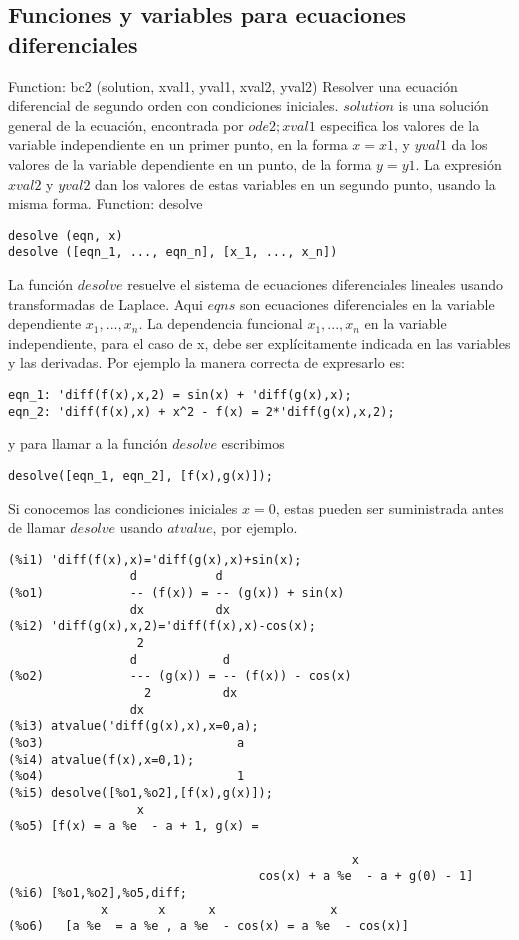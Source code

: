 \documentclass{article}
\begin{document}
\subsection{Funciones y variables para ecuaciones diferenciales}
Function: bc2 (solution, xval1, yval1, xval2, yval2)
\newline
Resolver una ecuación diferencial de segundo orden con condiciones iniciales.
$solution$ is una solución general de la ecuación, encontrada por $ode2;xval1$ especifica los valores de la variable independiente en un primer punto, en la forma $x=x1$, y $yval1$ da los valores de la variable dependiente en un punto, de la forma $y= y1$. La expresión $xval2$ y $yval2$ dan los valores de estas variables en un segundo punto, usando la misma forma.
\newline
Function: desolve
\newline
\begin{verbatim}
desolve (eqn, x)
desolve ([eqn_1, ..., eqn_n], [x_1, ..., x_n])
\end{verbatim}
La función $desolve$ resuelve el sistema de ecuaciones diferenciales lineales usando transformadas de Laplace. Aqui $eqns$ son ecuaciones diferenciales en la variable dependiente $x_1, ..., x_n$.
\newline
La dependencia funcional $x_1, ..., x_n$ en la variable independiente, para el caso de x, debe ser explícitamente indicada en las variables y las derivadas. Por ejemplo la manera correcta de expresarlo es:
\begin{verbatim}
eqn_1: 'diff(f(x),x,2) = sin(x) + 'diff(g(x),x);
eqn_2: 'diff(f(x),x) + x^2 - f(x) = 2*'diff(g(x),x,2);
\end{verbatim}
y para llamar a la función $desolve$ escribimos
\begin{verbatim}
desolve([eqn_1, eqn_2], [f(x),g(x)]);
\end{verbatim}
Si conocemos las condiciones iniciales $x=0$, estas pueden ser suministrada antes de llamar $desolve$ usando $atvalue$, por ejemplo.
\begin{verbatim}
(%i1) 'diff(f(x),x)='diff(g(x),x)+sin(x);
                 d           d
(%o1)            -- (f(x)) = -- (g(x)) + sin(x)
                 dx          dx
(%i2) 'diff(g(x),x,2)='diff(f(x),x)-cos(x);
                  2
                 d            d
(%o2)            --- (g(x)) = -- (f(x)) - cos(x)
                   2          dx
                 dx
(%i3) atvalue('diff(g(x),x),x=0,a);
(%o3)                           a
(%i4) atvalue(f(x),x=0,1);
(%o4)                           1
(%i5) desolve([%o1,%o2],[f(x),g(x)]);
                  x
(%o5) [f(x) = a %e  - a + 1, g(x) =

                                                x
                                   cos(x) + a %e  - a + g(0) - 1]
(%i6) [%o1,%o2],%o5,diff;
             x       x      x                x
(%o6)   [a %e  = a %e , a %e  - cos(x) = a %e  - cos(x)]
\end{verbatim}
\end{document}
